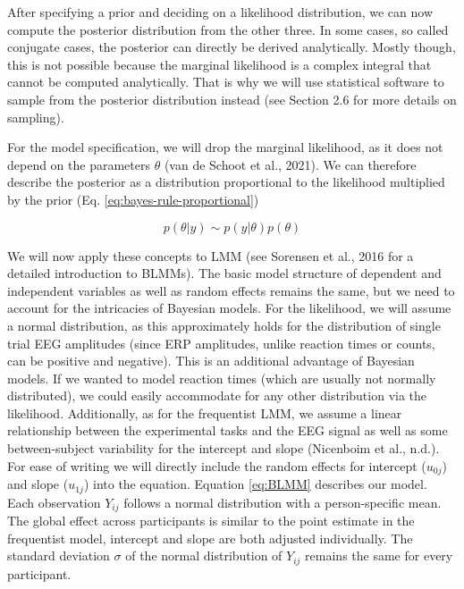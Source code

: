 \documentclass[
  doc,12pt,floatsintext]{apa7}
\begin{document}
After specifying a prior and deciding on a likelihood distribution, we can now compute the posterior distribution from the other three. In some cases, so called conjugate cases, the posterior can directly be derived analytically. Mostly though, this is not possible because the marginal likelihood is a complex integral that cannot be computed analytically. That is why we will use statistical software to sample from the posterior distribution instead (see Section 2.6 for more details on sampling).

For the model specification, we will drop the marginal likelihood, as it does not depend on the parameters \(\theta\) (van de Schoot et al., 2021). We can therefore describe the posterior as a distribution proportional to the likelihood multiplied by the prior (Eq. \eqref{eq:bayes-rule-proportional})

\begin{equation}
p(\theta|y) \sim p(y|\theta)p(\theta)
\label{eq:bayes-rule-proportional}
\end{equation}

We will now apply these concepts to LMM (see Sorensen et al., 2016 for a detailed introduction to BLMMs). The basic model structure of dependent and independent variables as well as random effects remains the same, but we need to account for the intricacies of Bayesian models. For the likelihood, we will assume a normal distribution, as this approximately holds for the distribution of single trial EEG amplitudes (since ERP amplitudes, unlike reaction times or counts, can be positive and negative). This is an additional advantage of Bayesian models. If we wanted to model reaction times (which are usually not normally distributed), we could easily accommodate for any other distribution via the likelihood. Additionally, as for the frequentist LMM, we assume a linear relationship between the experimental tasks and the EEG signal as well as some between-subject variability for the intercept and slope (Nicenboim et al., n.d.). For ease of writing we will directly include the random effects for intercept (\(u_{0j}\)) and slope (\(u_{1j}\)) into the equation. Equation \eqref{eq:BLMM} describes our model. Each observation \(Y_{ij}\) follows a normal distribution with a person-specific mean. The global effect across participants is similar to the point estimate in the frequentist model, intercept and slope are both adjusted individually. The standard deviation \(\sigma\) of the normal distribution of \(Y_{ij}\) remains the same for every participant.
\end{document}
